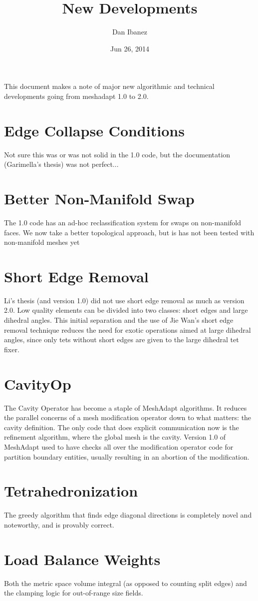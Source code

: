 \documentclass{article}
\title{New Developments}
\author{Dan Ibanez}
\date{Jun 26, 2014}
\begin{document}
\maketitle
This document makes a note of major new algorithmic and technical
developments going from meshadapt 1.0 to 2.0.

\section{Edge Collapse Conditions}
Not sure this was or was not solid in the 1.0 code, but
the documentation (Garimella's thesis) was not perfect...
\section{Better Non-Manifold Swap}
The 1.0 code has an ad-hoc reclassification system for
swaps on non-manifold faces.
We now take a better topological approach, but is has not
been tested with non-manifold meshes yet
\section{Short Edge Removal}
Li's thesis (and version 1.0) did not use short edge removal
as much as version 2.0.
Low quality elements can be divided into two classes:
short edges and large dihedral angles.
This initial separation and the use of Jie Wan's short
edge removal technique reduces the need for exotic operations
aimed at large dihedral angles,
since only tets without short edges are given to the large
dihedral tet fixer.
\section{CavityOp}
The Cavity Operator has become a staple of MeshAdapt algorithms.
It reduces the parallel concerns of a mesh modification operator
down to what matters: the cavity definition.
The only code that does explicit communication now is the
refinement algorithm, where the global mesh is the cavity.
Version 1.0 of MeshAdapt used to have checks all over the modification
operator code for partition boundary entities, usually resulting
in an abortion of the modification.
\section{Tetrahedronization}
The greedy algorithm that finds edge diagonal directions is completely
novel and noteworthy, and is provably correct.
\section{Load Balance Weights}
Both the metric space volume integral (as opposed to counting split edges)
and the clamping logic for out-of-range size fields.
\end{document}
